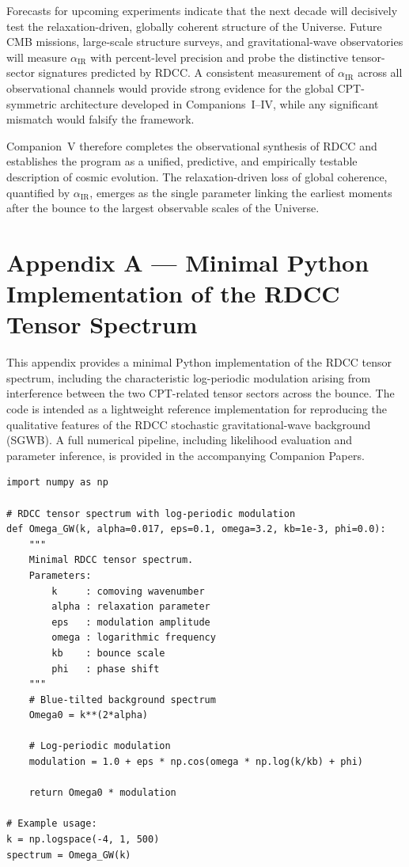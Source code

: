 \documentclass[11pt,a4paper]{article}
\begin{document}
Forecasts for upcoming experiments indicate that the next decade will decisively test the
relaxation-driven, globally coherent structure of the Universe. Future CMB missions, large-scale
structure surveys, and gravitational-wave observatories will measure $\alpha_{\mathrm{IR}}$ with
percent-level precision and probe the distinctive tensor-sector signatures predicted by RDCC.
A consistent measurement of $\alpha_{\mathrm{IR}}$ across all observational channels would provide
strong evidence for the global CPT-symmetric architecture developed in Companions~I–IV,
while any significant mismatch would falsify the framework.

Companion~V therefore completes the observational synthesis of RDCC and establishes the
program as a unified, predictive, and empirically testable description of cosmic evolution. The
relaxation-driven loss of global coherence, quantified by $\alpha_{\mathrm{IR}}$, emerges as the single
parameter linking the earliest moments after the bounce to the largest observable scales of the
Universe.

\appendix
\section*{Appendix A — Minimal Python Implementation of the RDCC Tensor Spectrum}

This appendix provides a minimal Python implementation of the RDCC tensor spectrum,
including the characteristic log-periodic modulation arising from interference between the
two CPT-related tensor sectors across the bounce. The code is intended as a lightweight
reference implementation for reproducing the qualitative features of the RDCC stochastic
gravitational-wave background (SGWB). A full numerical pipeline, including likelihood
evaluation and parameter inference, is provided in the accompanying Companion Papers.

\begin{verbatim}
import numpy as np

# RDCC tensor spectrum with log-periodic modulation
def Omega_GW(k, alpha=0.017, eps=0.1, omega=3.2, kb=1e-3, phi=0.0):
    """
    Minimal RDCC tensor spectrum.
    Parameters:
        k     : comoving wavenumber
        alpha : relaxation parameter
        eps   : modulation amplitude
        omega : logarithmic frequency
        kb    : bounce scale
        phi   : phase shift
    """
    # Blue-tilted background spectrum
    Omega0 = k**(2*alpha)

    # Log-periodic modulation
    modulation = 1.0 + eps * np.cos(omega * np.log(k/kb) + phi)

    return Omega0 * modulation

# Example usage:
k = np.logspace(-4, 1, 500)
spectrum = Omega_GW(k)
\end{verbatim}
\end{document}
